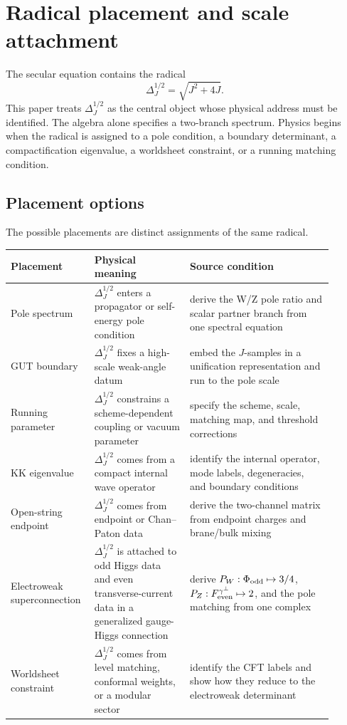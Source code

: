 \section{Radical placement and scale attachment}
\label{sec:radical-placement}

The secular equation contains the radical
\begin{equation}
  \Delta_J^{1/2}=\sqrt{J^2+4J}.
  \label{eq:radical-object}
\end{equation}
This paper treats \(\Delta_J^{1/2}\) as the central object whose physical address must be identified.  The algebra alone specifies a two-branch spectrum.  Physics begins when the radical is assigned to a pole condition, a boundary determinant, a compactification eigenvalue, a worldsheet constraint, or a running matching condition.

\subsection{Placement options}

The possible placements are distinct assignments of the same radical.
\begin{center}
\small
\begin{tabular}{p{0.20\linewidth}p{0.28\linewidth}p{0.42\linewidth}}
\toprule
Placement & Physical meaning & Source condition\\
\midrule
Pole spectrum & \(\Delta_J^{1/2}\) enters a propagator or self-energy pole condition & derive the W/Z pole ratio and scalar partner branch from one spectral equation\\
GUT boundary & \(\Delta_J^{1/2}\) fixes a high-scale weak-angle datum & embed the \(J\)-samples in a unification representation and run to the pole scale\\
Running parameter & \(\Delta_J^{1/2}\) constrains a scheme-dependent coupling or vacuum parameter & specify the scheme, scale, matching map, and threshold corrections\\
KK eigenvalue & \(\Delta_J^{1/2}\) comes from a compact internal wave operator & identify the internal operator, mode labels, degeneracies, and boundary conditions\\
Open-string endpoint & \(\Delta_J^{1/2}\) comes from endpoint or Chan--Paton data & derive the two-channel matrix from endpoint charges and brane/bulk mixing\\
Electroweak superconnection & \(\Delta_J^{1/2}\) is attached to odd Higgs data and even transverse-current data in a generalized gauge-Higgs connection & derive \(P_W:\Phi_{\rm odd}\mapsto3/4\), \(P_Z:F_{\rm even}^{\gamma^\perp}\mapsto2\), and the pole matching from one complex\\
Worldsheet constraint & \(\Delta_J^{1/2}\) comes from level matching, conformal weights, or a modular sector & identify the CFT labels and show how they reduce to the electroweak determinant\\
\bottomrule
\end{tabular}
\end{center}

